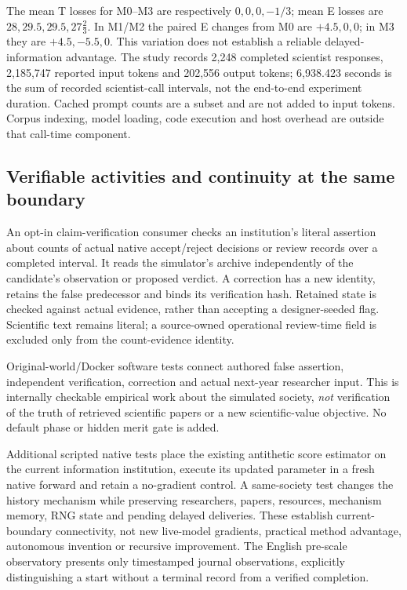 The mean T losses for M0--M3 are respectively $0,0,0,-1/3$; mean E losses
are $28,29.5,29.5,27\frac{2}{3}$. In M1/M2 the paired E changes from M0 are
$+4.5,0,0$; in M3 they are $+4.5,-5.5,0$. This variation does not establish
a reliable delayed-information advantage. The study records 2,248 completed
scientist responses, 2,185,747 reported input tokens and 202,556 output tokens;
6,938.423 seconds is the sum of recorded scientist-call intervals, not the
end-to-end experiment duration. Cached prompt counts are a subset and are
not added to input tokens. Corpus indexing, model loading, code execution
and host overhead are outside that call-time component.



\subsection{Verifiable activities and continuity at the same boundary}
An opt-in claim-verification consumer checks an institution's literal assertion
about counts of actual native accept/reject decisions or review records over
a completed interval. It reads the simulator's archive independently of the
candidate's observation or proposed verdict. A correction has a new identity,
retains the false predecessor and binds its verification hash. Retained state
is checked against actual evidence, rather than accepting a designer-seeded
 flag. Scientific text remains literal; a source-owned
operational review-time field is excluded only from the count-evidence identity.

Original-world/Docker software tests connect authored false assertion,
independent verification, correction and actual next-year researcher input.
This is internally checkable empirical work about the simulated society,
\emph{not} verification of the truth of retrieved scientific papers or a new
scientific-value objective. No default phase or hidden merit gate is added.

Additional scripted native tests place the existing antithetic score estimator
on the current information institution, execute its updated parameter in a
fresh native forward and retain a no-gradient control. A same-society test
changes the history mechanism while preserving researchers, papers, resources,
mechanism memory, RNG state and pending delayed deliveries. These establish
current-boundary connectivity, not new live-model gradients, practical method
advantage, autonomous invention or recursive improvement. The English
pre-scale observatory presents only timestamped journal observations, explicitly
distinguishing a start without a terminal record from a verified completion.
